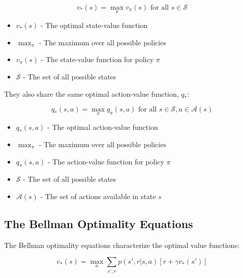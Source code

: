 \documentclass[12pt,a4paper]{article}
\begin{document}
\begin{equation}
v_*(s) = \max_{\pi} v_\pi(s) \text{ for all } s \in \mathcal{S}
\end{equation}

\begin{tcolorbox}[title=Notation Overview]
\begin{itemize}
    \item $v_*(s)$ - The optimal state-value function
    \item $\max_{\pi}$ - The maximum over all possible policies
    \item $v_\pi(s)$ - The state-value function for policy $\pi$
    \item $\mathcal{S}$ - The set of all possible states
\end{itemize}
\end{tcolorbox}

They also share the same optimal action-value function, $q_*$:

\begin{equation}
q_*(s,a) = \max_{\pi} q_\pi(s,a) \text{ for all } s \in \mathcal{S}, a \in \mathcal{A}(s)
\end{equation}

\begin{tcolorbox}[title=Notation Overview]
\begin{itemize}
    \item $q_*(s,a)$ - The optimal action-value function
    \item $\max_{\pi}$ - The maximum over all possible policies
    \item $q_\pi(s,a)$ - The action-value function for policy $\pi$
    \item $\mathcal{S}$ - The set of all possible states
    \item $\mathcal{A}(s)$ - The set of actions available in state $s$
\end{itemize}
\end{tcolorbox}

\subsection{The Bellman Optimality Equations}

The Bellman optimality equations characterize the optimal value functions:

\begin{equation}
v_*(s) = \max_a \sum_{s',r} p(s',r|s,a) [r + \gamma v_*(s')]
\end{equation}
\end{document}
